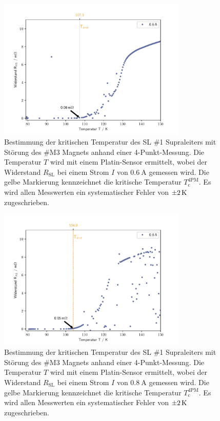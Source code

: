 \begin{figure}[H]
    \centering
    \includegraphics[width=0.8\textwidth]{Auswertung/I_krit_Pt_b/R_T_0.6A.pdf}
    \caption{Bestimmung der kritischen Temperatur des SL \#1 Supraleiters mit
    Störung des \#M3 Magnets anhand einer 4-Punkt-Messung. Die Temperatur $T$
    wird mit einem Platin-Sensor
    ermittelt, wobei der Widerstand $R_{\text{SL}}$ bei einem Strom $I$ von
    $\SI{0.6}{\ampere}$ gemessen wird.
		Die gelbe Markierung kennzeichnet die kritische Temperatur	$T^{\text{4PM}}_{\text{c}}$.
		Es wird allen Messwerten ein systematischer Fehler von $\SI{\pm2}{\kelvin}$
		zugeschrieben.}
    \label{fig:Tc2.1}
\end{figure}

\begin{figure}[H]
    \centering
    \includegraphics[width=0.8\textwidth]{Auswertung/I_krit_Pt_b/R_T_0.8A.pdf}
    \caption{Bestimmung der kritischen Temperatur des SL \#1 Supraleiters mit
    Störung des \#M3 Magnets anhand einer 4-Punkt-Messung. Die Temperatur $T$
    wird mit einem Platin-Sensor
    ermittelt, wobei der Widerstand $R_{\text{SL}}$ bei einem Strom $I$ von
    $\SI{0.8}{\ampere}$ gemessen wird.
		Die gelbe Markierung kennzeichnet die kritische Temperatur	$T^{\text{4PM}}_{\text{c}}$.
		Es wird allen Messwerten ein systematischer Fehler von $\SI{\pm2}{\kelvin}$
		zugeschrieben.}
    \label{fig:Tc2.2}
\end{figure}

